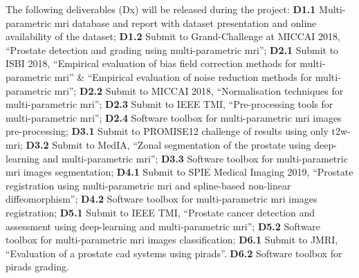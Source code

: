The following deliverables (Dx) will be released during the project:
\textbf{D1.1} Multi-parametric \ac{mri} database and report with dataset presentation and online availability of the dataset;
\textbf{D1.2} Submit to Grand-Challenge at MICCAI 2018, ``Prostate detection and grading using multi-parametric \ac{mri}'';
\textbf{D2.1} Submit to ISBI 2018, ``Empirical evaluation of bias field correction methods for multi-parametric \ac{mri}'' \& ``Empirical evaluation of noise reduction methods for multi-parametric \ac{mri}'';
\textbf{D2.2} Submit to MICCAI 2018, ``Normalisation techniques for multi-parametric \ac{mri}'';
\textbf{D2.3} Submit to IEEE TMI, ``Pre-processing tools for multi-parametric \ac{mri}'';
\textbf{D2.4} Software toolbox for multi-parametric \ac{mri} images pre-processing;
\textbf{D3.1} Submit to PROMISE12 challenge of results using only \ac{t2w}-\ac{mri};
\textbf{D3.2} Submit to MedIA, ``Zonal segmentation of the prostate using deep-learning and multi-parametric \ac{mri}'';
\textbf{D3.3} Software toolbox for multi-parametric \ac{mri} images segmentation;
\textbf{D4.1} Submit to SPIE Medical Imaging 2019, ``Prostate registration using multi-parametric \ac{mri} and spline-based non-linear diffeomorphism'';
\textbf{D4.2} Software toolbox for multi-parametric \ac{mri} images registration;
\textbf{D5.1} Submit to IEEE TMI, ``Prostate cancer detection and assessment using deep-learning and multi-parametric \ac{mri}'';
\textbf{D5.2} Software toolbox for multi-parametric \ac{mri} images classification;
\textbf{D6.1} Submit to JMRI, ``Evaluation of a prostate \ac{cad} systems using \ac{pirads}''.
\textbf{D6.2} Software toolbox for \ac{pirads} grading.

